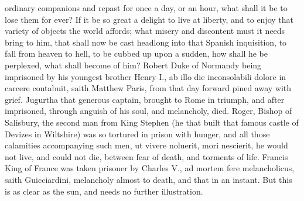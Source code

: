 {ordinary companions and repast for once a day, or an hour, what shall
it be to lose them for ever? If it be so great a delight to live at
liberty, and to enjoy that variety of objects the world affords; what
misery and discontent must it needs bring to him, that shall now be
cast headlong into that Spanish inquisition, to fall from heaven to
hell, to be cubbed up upon a sudden, how shall he be perplexed, what
shall become of him? Robert Duke of Normandy being imprisoned by
his youngest brother Henry I., ab illo die inconsolabili dolore in
carcere contabuit, saith Matthew Paris, from that day forward pined
away with grief. Jugurtha that generous captain, brought to Rome
in triumph, and after imprisoned, through anguish of his soul, and
melancholy, died. Roger, Bishop of Salisbury, the second man from
King Stephen (he that built that famous castle of Devizes in
Wiltshire) was so tortured in prison with hunger, and all those
calamities accompanying such men, ut vivere noluerit, mori
nescierit, he would not live, and could not die, between fear of death,
and torments of life. Francis King of France was taken prisoner by
Charles V., ad mortem fere melancholicus, saith Guicciardini,
melancholy almost to death, and that in an instant. But this is as
clear as the sun, and needs no further illustration.

}
